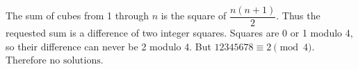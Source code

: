 The sum of cubes from 1 through $n$ is the square of $\dfrac{n(n+1)}{2}$. Thus the requested sum is a difference of two integer squares. Squares are 0 or 1 modulo 4, so their difference can never be 2 modulo 4. But $12345678\equiv2\pmod4$. Therefore $\boxed{\text{no solutions}}$.
